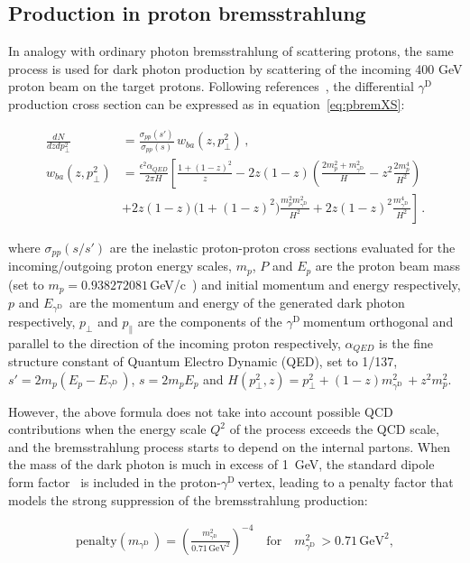 \documentclass[12pt,a4paper,]{article}
\newcommand{\mathDP}{\gamma^{\mathrm{D}}\ }
\newcommand{\DP}{$\mathDP$}
\begin{document}
\subsection{Production in proton bremsstrahlung}
\label{sec:pbrem}

In analogy with ordinary photon bremsstrahlung of scattering protons,
the same process is used for dark photon production by scattering of
the incoming 400 GeV proton beam on the target protons. Following
references~\cite{Blumlein:2013cua, Gorbunov:2014wqa}, the differential
\DP production cross section can be expressed as in
equation~\ref{eq:pbremXS}:

\begin{align}
	\frac{d N}{dz dp_\perp^2} &= \frac{\sigma_{pp}(s')}{\sigma_{pp}(s)}\,
	w_{ba}(z,p_\perp^2)\,,\label{eq:pbremXS}\\
w_{ba}(z,p_\perp^2) &= \frac{\epsilon^2 \alpha_{QED}}{2\pi H}
\left[\frac{1+(1-z)^2}{z} -2z(1-z)\left(\frac{2m_p^2+m_{\mathDP}^2}{H}
-z^2\frac{2m_p^4}{H^2}\right) \right. \nonumber \\
&\left.+2z(1-z)\big(1+(1-z)^2\big)\frac{m_p^2m_{\mathDP}^2}{H^2}
+2z(1-z)^2\frac{m_{\mathDP}^4}{H^2} \right]\,.\nonumber
\end{align}

where $\sigma_{pp}(s/s')$ are the inelastic proton-proton
cross sections evaluated for the incoming/outgoing proton energy
scales, $m_p$, $P$ and $E_p$ are the proton beam mass (set to $m_p =
0.938272081$\,GeV/c~\cite{Patrignani:2016xqp}) and initial momentum
and energy respectively, $p$ and $E_{\mathDP}$ are the momentum and
energy of the generated dark photon respectively, $p_\perp$ and
$p_\parallel$ are the components of the \DP momentum orthogonal and
parallel to the direction of the incoming proton respectively,
$\alpha_{QED}$ is the fine structure constant of Quantum
Electro Dynamic (QED), set to 1/137, $s'=2m_p(E_p-E_{\mathDP})$,
$s=2m_pE_p$ and
$H(p^2_\perp,z)=p_\perp^2+(1-z)m_{\mathDP}^2+z^2m_p^2$.

However, the above formula does not take into account possible QCD
contributions when the energy scale $Q^2$ of the process exceeds the
QCD scale, and the bremsstrahlung process starts to depend on the
internal partons. When the mass of the dark photon is much in excess
of 1~GeV, the standard dipole form
factor~\cite{RevModPhys.35.335} is included in the proton-\DP vertex,
leading to a penalty factor that models the strong suppression of the
bremsstrahlung production:

\begin{align}
	\mathrm{penalty}(m_{\mathDP}) = {\left(\frac{m_{\mathDP}^2}{0.71\,\mathrm{GeV}^2}\right)}^{-4}\quad \mathrm{ for }\quad m_{\mathDP}^2 > 0.71\,\mathrm{GeV}^2,
\end{align}
\end{document}
